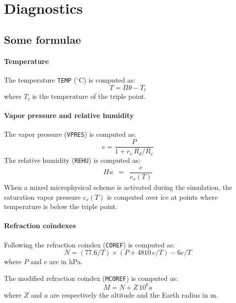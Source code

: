 \chapter{Diagnostics}
\minitoc


\section{Some formulae}

\subsubsection{Temperature}
The temperature {\tt TEMP} ($^\circ$C) is computed as:
\begin{equation}
T = \Pi \theta - T_t
\end{equation}
where $T_t$ is the temperature of the triple point.


\subsubsection{Vapor pressure  and  relative humidity}
The vapor pressure ({\tt VPRES}) is computed as:
\begin{equation}
e = \dfrac{P}{1 + r_v \, R_d/R_v} 
\end{equation}
The relative humidity ({\tt REHU}) is computed as:
\begin{eqnarray}
Hu &=& \dfrac{e}{e_s(T)} 
\end{eqnarray}
When a mixed microphysical scheme is activated during the simulation,
 the saturation vapor pressure $e_s(T)$ is computed over ice
 at points where temperature is below the triple point.
 

\subsubsection{Refraction coindexes}
Following \citet{Hill1980} the refraction coindex ({\tt COREF}) is computed as:
\begin{equation}
  N = (77.6/T)\times(P+4810\,e/T) -6e/T
\end{equation}
where $P$ and $e$ are in hPa.

\noindent The modified refraction coindex ({\tt MCOREF}) is computed as:
\begin{equation}
  M = N + Z\,10^6 a
\end{equation}
where $Z$ and $a$ are respectively the altitude and the Earth radius in m.


